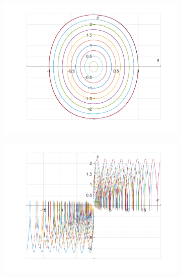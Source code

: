 \documentclass{article}
\begin{document}
	\begin{figure}[h!]
		\centering
		\begin{subfigure}[b]{0.48\linewidth}
			\includegraphics[width=\linewidth]{./SmallOscillations/S4/F5.png}
		\end{subfigure}
		\begin{subfigure}[b]{0.48\linewidth}
			\includegraphics[width=\linewidth]{./SmallOscillations/S4/F6.png}
		\end{subfigure}
	\end{figure}
	\newpage
	
\end{document}
